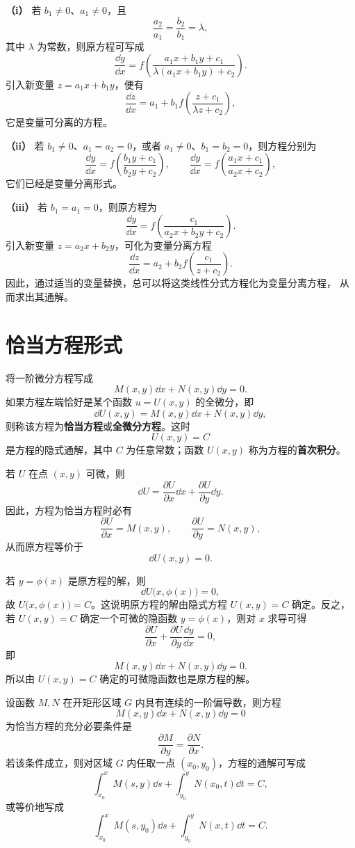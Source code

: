 \textbf{（i）} 若 $b_1\neq 0$、$a_1\neq 0$，且
\[
	\dfrac{a_2}{a_1}=\dfrac{b_2}{b_1}=\lambda,
\]
其中 $\lambda$ 为常数，则原方程可写成
\[
	\dfrac{\dd y}{\dd x}
	=f\left(\dfrac{a_1x+b_1y+c_1}{\lambda(a_1x+b_1y)+c_2}\right).
\]
引入新变量 $z=a_1x+b_1y$，便有
\[
	\dfrac{\dd z}{\dd x}
	=a_1+b_1f\left(\dfrac{z+c_1}{\lambda z+c_2}\right),
\]
它是变量可分离的方程。

\textbf{（ii）} 若 $b_1\neq 0$、$a_1=a_2=0$，或者
$a_1\neq 0$、$b_1=b_2=0$，则方程分别为
\[
	\dfrac{\dd y}{\dd x}=f\left(\dfrac{b_1y+c_1}{b_2y+c_2}\right),
	\qquad
	\dfrac{\dd y}{\dd x}=f\left(\dfrac{a_1x+c_1}{a_2x+c_2}\right),
\]
它们已经是变量分离形式。

\textbf{（iii）} 若 $b_1=a_1=0$，则原方程为
\[
	\dfrac{\dd y}{\dd x}
	=f\left(\dfrac{c_1}{a_2x+b_2y+c_2}\right).
\]
引入新变量 $z=a_2x+b_2y$，可化为变量分离方程
\[
	\dfrac{\dd z}{\dd x}
	=a_2+b_2f\left(\dfrac{c_1}{z+c_2}\right).
\]
因此，通过适当的变量替换，总可以将这类线性分式方程化为变量分离方程，
从而求出其通解。

\section{恰当方程形式}\label{sec:恰当方程形式}

\begin{definition}\label{def:恰当方程与首次积分}
	将一阶微分方程写成
\[
	M(x,y)\dd x+N(x,y)\dd y=0.
\]
如果方程左端恰好是某个函数 $u=U(x,y)$ 的全微分，即
\[
	\dd U(x,y)=M(x,y)\dd x+N(x,y)\dd y,
\]
则称该方程为\textbf{恰当方程}或\textbf{全微分方程}。这时
\[
	U(x,y)=C
\]
是方程的隐式通解，其中 $C$ 为任意常数；函数 $U(x,y)$ 称为方程的\textbf{首次积分}。
\end{definition}

若 $U$ 在点 $(x,y)$ 可微，则
\[
	\dd U=\dfrac{\partial U}{\partial x}\dd x
	+\dfrac{\partial U}{\partial y}\dd y.
\]
因此，方程为恰当方程时必有
\[
	\dfrac{\partial U}{\partial x}=M(x,y),
	\qquad
	\dfrac{\partial U}{\partial y}=N(x,y),
\]
从而原方程等价于
\[
	\dd U(x,y)=0.
\]

若 $y=\phi(x)$ 是原方程的解，则
\[
	\dd U\bigl(x,\phi(x)\bigr)=0,
\]
故 $U\bigl(x,\phi(x)\bigr)=C$。这说明原方程的解由隐式方程
$U(x,y)=C$ 确定。反之，若 $U(x,y)=C$ 确定一个可微的隐函数
$y=\phi(x)$，则对 $x$ 求导可得
\[
	\dfrac{\partial U}{\partial x}
	+\dfrac{\partial U}{\partial y}\dfrac{\dd y}{\dd x}=0,
\]
即
\[
	M(x,y)\dd x+N(x,y)\dd y=0.
\]
所以由 $U(x,y)=C$ 确定的可微隐函数也是原方程的解。

\begin{theorem}\label{thm:恰当方程的判别条件}\label{恰当方程的判别条件}
设函数 $M,N$ 在开矩形区域 $G$ 内具有连续的一阶偏导数，则方程
\[
	M(x,y)\dd x+N(x,y)\dd y=0
\]
为恰当方程的充分必要条件是
\[
	\dfrac{\partial M}{\partial y}
	=\dfrac{\partial N}{\partial x}.
\]
若该条件成立，则对区域 $G$ 内任取一点 $(x_0,y_0)$，方程的通解可写成
\[
	\int_{x_0}^{x}M(s,y)\dd s
	+\int_{y_0}^{y}N(x_0,t)\dd t=C,
\]
或等价地写成
\[
	\int_{x_0}^{x}M(s,y_0)\dd s
	+\int_{y_0}^{y}N(x,t)\dd t=C.
\]
\end{theorem}

